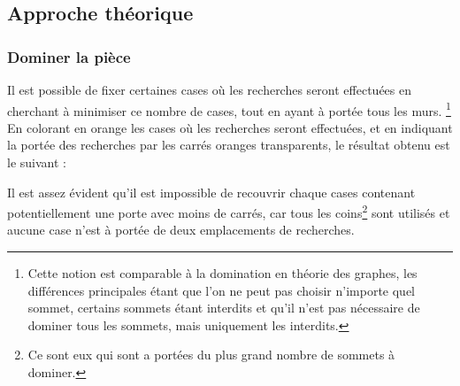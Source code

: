 \documentclass[a4paper,12pt]{article}
\begin{document}
\subsection{Approche théorique}

\subsubsection{Dominer la pièce}
Il est possible de fixer certaines cases où les recherches seront effectuées en
cherchant à minimiser ce nombre de cases, tout en ayant à portée tous les murs.
\footnote{Cette notion est comparable à la domination en théorie des graphes,
  les différences principales étant que l'on ne peut pas choisir n'importe quel
  sommet, certains sommets étant interdits et qu'il n'est pas nécessaire de
  dominer tous les sommets, mais uniquement les interdits.}
\\
En colorant en orange les cases où les recherches seront effectuées, et en
indiquant la portée des recherches par les carrés oranges transparents, le
résultat obtenu est le suivant :

\begin{center}
\end{center}
Il est assez évident qu'il est impossible de recouvrir chaque cases contenant
potentiellement une porte avec moins de carrés, car tous les coins\footnote{Ce
sont eux qui sont a portées du plus grand nombre de sommets à dominer.} sont
utilisés et aucune case n'est à portée de deux emplacements de recherches.
\end{document}

